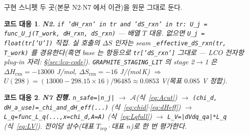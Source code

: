 \documentclass[11pt,a4paper]{article}
\newtheorem*{codebox}{코드 대응}
\newcommand{\rxn}{\mathrm{rxn}}
\newcommand{\rep}{\mathrm{rep}}
\newcommand{\code}[1]{\texttt{#1}}
\begin{document}
구현 스니펫 두 곳(본문 N2$\cdot$N7 에서 이관)을 원문 그대로 둔다.
\begin{codebox}
\textbf{N2.} \code{if 'dH\_rxn' in tr and 'dS\_rxn' in tr: U\_j = func\_U\_j(T\_work, dH\_rxn, dS\_rxn)}
— 배열 $T$ 대응. 없으면 \code{U\_j = float(tr['U'])} 직접. 실 호출의 $\Delta S$ 인자는 seam
\code{\_effective\_dS\_rxn(tr, T\_work)} 를 경유한다(흑연 base 는 항등으로 \code{tr['dS\_rxn']} 그대로 —
LCO 전자항 plug-in 자리: \S\ref{sec:lco-code}). \code{GRAPHITE\_STAGING\_LIT} 의 stage 2$\to$1 은
$\Delta H_\rxn=-13000$ J/mol, $\Delta S_\rxn=-16$ J/(mol\,K) $\Rightarrow$ $U(298)=(13000-298.15\times16)/96485
\approx0.0853$ V(목표 $0.085$ V 정합).
\end{codebox}
\begin{codebox}
\textbf{N7 진행.} \code{n\_safe=|n\_j|} $\to$ $\mathcal A$(식~\eqref{eq:Acut}) $\to$
\code{(chi\_d, dH\_a\_use)=\_chi\_and\_dH\_eff(...)} (식~\eqref{eq:chid}$\cdot$\eqref{eq:dHeff}) $\to$
\code{L\_q=func\_L\_q(...,x=chi\_d,A=A)} (식~\eqref{eq:Lqfull}) $\to$ \code{L\_V=|dVdq\_qa|*L\_q} (식~\eqref{eq:LV}).
전이당 \emph{상수}(대표 $T_\rep\cdot$대표 $n$)로 한 번 평가한다.
\end{codebox}
\end{document}

